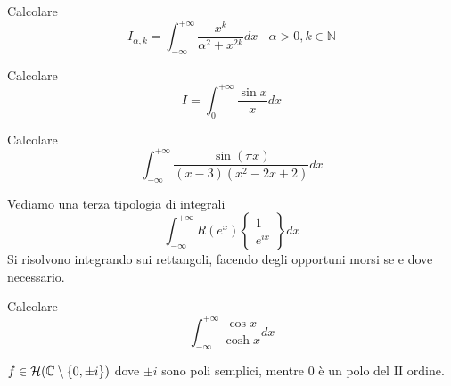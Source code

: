 \begin{figure}[htpb]
\end{figure}
\FloatBarrier
Calcolare
\begin{equation*}
I_{\alpha ,k} =\int ^{+\infty }_{-\infty }\frac{x^{k}}{\alpha ^{2} +x^{2k}} dx\ \ \ \ \alpha  >0,k\in \mathbb{N}
\end{equation*}
\Esercizio{}

Calcolare
\begin{equation*}
I=\int ^{+\infty }_{0}\frac{\sin x}{x} dx
\end{equation*}
\Esercizio{}

Calcolare
\begin{equation*}
\int ^{+\infty }_{-\infty }\frac{\sin\left( \pi x\right)}{\left( x-3\right)\left( x^{2} -2x+2\right)} dx
\end{equation*}
\Esercizio{}

Vediamo una terza tipologia di integrali
\begin{equation*}
\boxed{\int ^{+\infty }_{-\infty } R\left( e^{x}\right)\left\{\begin{array}{ c }
1\\
e^{ix}
\end{array}\right\} dx}
\end{equation*}
Si risolvono integrando sui rettangoli, facendo degli opportuni morsi se e dove necessario.

Calcolare
\begin{equation*}
\int ^{+\infty }_{-\infty }\frac{\cos x}{\cosh x} dx
\end{equation*}
\ParteSoluzioni
\Soluzione

$f\in \mathcal{H} (\mathbb{C}  \setminus \{0,\pm i\})$ dove $\pm i$ sono poli semplici, mentre $0$ è un polo del II ordine. 


